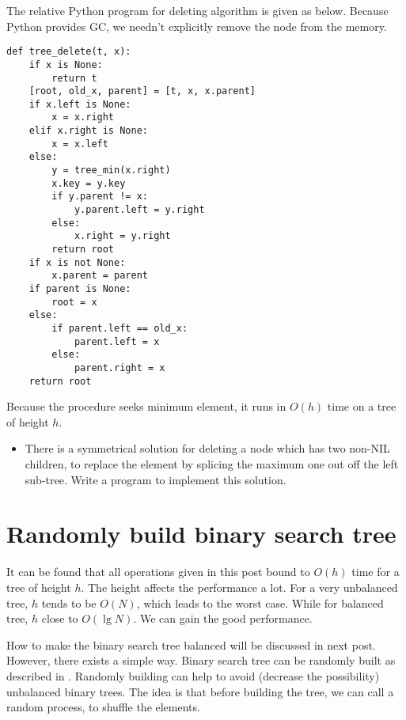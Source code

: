 \documentclass[UTF8]{article}
\begin{document}
The relative Python program for deleting algorithm is given as below.
Because Python provides GC, we needn't explicitly remove the node
from the memory.

\lstset{language=Python}
\begin{lstlisting}
def tree_delete(t, x):
    if x is None:
        return t
    [root, old_x, parent] = [t, x, x.parent]
    if x.left is None:
        x = x.right
    elif x.right is None:
        x = x.left
    else:
        y = tree_min(x.right)
        x.key = y.key
        if y.parent != x:
            y.parent.left = y.right
        else:
            x.right = y.right
        return root
    if x is not None:
        x.parent = parent
    if parent is None:
        root = x
    else:
        if parent.left == old_x:
            parent.left = x
        else:
            parent.right = x
    return root
\end{lstlisting}

Because the procedure seeks minimum element, it runs in $O(h)$ time on
a tree of height $h$.

\begin{Exercise}

\begin{itemize}
\item There is a symmetrical solution for deleting a node which has two
non-NIL children, to replace the element by splicing the maximum one out
off the left sub-tree. Write a program to implement this solution.
\end{itemize}

\end{Exercise}

\section{Randomly build binary search tree}
It can be found that all operations given in this post bound to $O(h)$
time for a tree of height $h$. The height affects the performance
a lot. For a very unbalanced tree, $h$ tends to be $O(N)$, which leads
to the worst case. While for balanced tree, $h$ close to $O(\lg N)$.
We can gain the good performance.

How to make the binary search tree
balanced will be discussed in next post. However, there exists a simple
way. Binary search tree can be randomly built as described in \cite{CLRS}.
Randomly building can help to avoid (decrease the possibility) unbalanced
binary trees. The idea is that before building the tree, we can call a random
process, to shuffle the elements.
\end{document}
